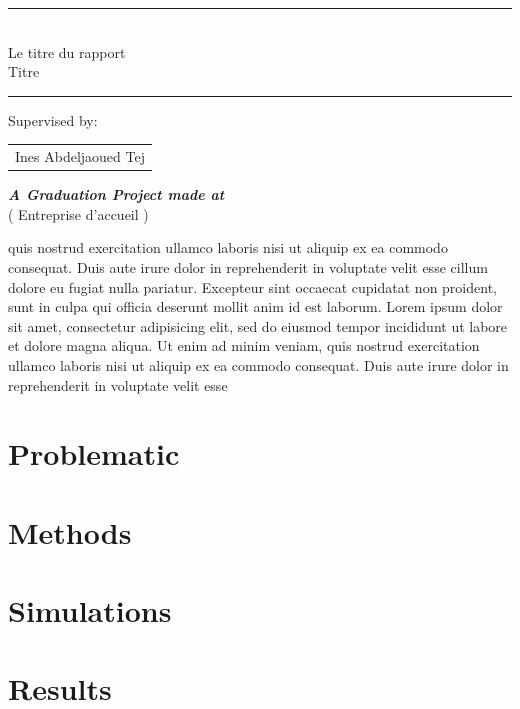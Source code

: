 \documentclass{article}
\newcommand{\reportSubject} {%
  Le titre du rapport \\ Titre%
}
\newcommand{\studyDepartment} {%
  Entreprise d'accueil %
}
\begin{document}
\begin{titlepage}
\begin{center}
\vspace{10pt} {%
  \renewcommand*{\familydefault}{\defaultFont}
  \fontsize{27pt}{27pt}\selectfont%
  \rule{0.5\textwidth}{.4pt}\\
  \vspace{10pt}
  \reportSubject{}\\%
  \vspace{10pt}
  \rule{0.5\textwidth}{.4pt}
}

\vspace{10pt}
Supervised by:\\
\vspace{20pt}
\begin{tabular}{c}Ines Abdeljaoued Tej \\
\end{tabular}

\vspace{30pt}%
\textbf{\textit{A Graduation Project made at}}\\

\vspace{10pt}
(\studyDepartment)\\
\end{center}
\end{titlepage}


\tableofcontents

\vspace{6cm}

quis nostrud exercitation ullamco laboris nisi ut aliquip ex ea commodo
consequat. Duis aute irure dolor in reprehenderit in voluptate velit esse
cillum dolore eu fugiat nulla pariatur. Excepteur sint occaecat cupidatat non
proident, sunt in culpa qui officia deserunt mollit anim id est laborum. Lorem ipsum dolor sit amet, consectetur adipisicing elit, sed do eiusmod
tempor incididunt ut labore et dolore magna aliqua. Ut enim ad minim veniam,
quis nostrud exercitation ullamco laboris nisi ut aliquip ex ea commodo
consequat. Duis aute irure dolor in reprehenderit in voluptate velit esse


\section{Problematic}
\section{Methods}
\section{Simulations}
\section{Results}



\end{document}
